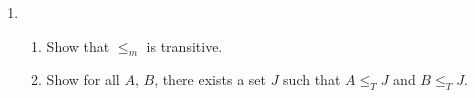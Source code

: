 \documentclass[11pt]{article}
\begin{document}
\begin{enumerate}
\item 
\begin{enumerate}
	\item Show that $\leq_m$ is transitive.
	\item Show for all $A$, $B$, there exists a set  $J$ such that 
		$A\leq_T J$ and $B\leq_T J$.	
\end{enumerate}

\end{enumerate}
\end{document}
